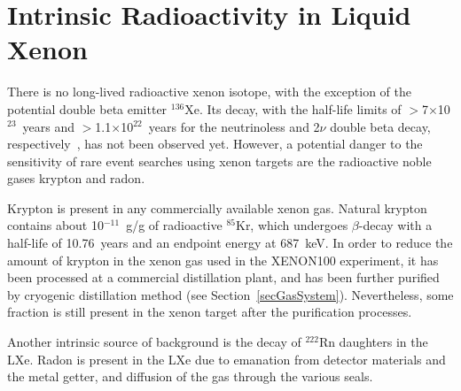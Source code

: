 \section{Intrinsic Radioactivity in Liquid Xenon}
\label{secIntrinsicRadioactivity}

There is no long-lived radioactive xenon isotope, with the exception of the potential double beta emitter $^{136}$Xe. Its decay, with the half-life limits of $>$7$\times$10$^{23}$~years and $>$1.1$\times$10$^{22}$~years for the neutrinoless and 2$\nu$ double beta decay, respectively~\cite{DoubleBetaLimit}, has not been observed yet. However, a potential danger to the sensitivity of rare event searches using xenon targets are the radioactive noble gases krypton and radon. 

Krypton is present in any commercially available xenon gas. Natural krypton contains about 10$^{-11}$~g/g of radioactive $^{85}$Kr, which undergoes $\beta$-decay with a half-life of 10.76~years and an endpoint energy at 687~keV. 
In order to reduce the amount of krypton in the xenon gas used in the XENON100 experiment, it has been processed at a commercial distillation plant, and has been further purified by cryogenic distillation method (see Section~\ref{secGasSystem}). Nevertheless, some fraction is still present in the xenon target after the purification processes.

Another intrinsic source of background is the decay of $^{222}$Rn daughters in the LXe. Radon is present in the LXe due to emanation from detector materials and the metal getter, and diffusion of the gas  through the various seals. 

